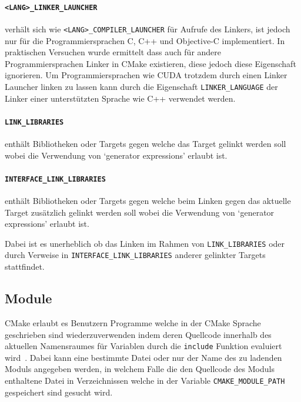 \documentclass[german,proseminar,hyperref,utf8,lof]{zihpub}
\begin{document}
    \paragraph{\texttt{<LANG>\_LINKER\_LAUNCHER}} verhält sich wie \texttt{<LANG>\_COMPILER\_LAUNCHER}
    für Aufrufe des Linkers, ist jedoch nur für die Programmiersprachen C, C++ und Objective-C implementiert.
    In praktischen Versuchen wurde ermittelt dass auch für andere Programmiersprachen Linker in CMake
    existieren, diese jedoch diese Eigenschaft ignorieren.
    Um Programmiersprachen wie CUDA trotzdem durch einen Linker Launcher linken zu lassen kann durch die
    Eigenschaft \texttt{LINKER\_LANGUAGE} der Linker einer unterstützten Sprache wie C++ verwendet werden.

    \paragraph{\texttt{LINK\_LIBRARIES}} enthält Bibliotheken oder Targets gegen welche das Target gelinkt
    werden soll wobei die Verwendung von `generator expressions' erlaubt ist.

    \paragraph{\texttt{INTERFACE\_LINK\_LIBRARIES}} enthält Bibliotheken oder Targets gegen welche beim Linken
    gegen das aktuelle Target zusätzlich gelinkt werden soll wobei die Verwendung von
    `generator expressions' erlaubt ist.

    Dabei ist es unerheblich ob das Linken im Rahmen von \texttt{LINK\_LIBRARIES} oder durch Verweise
    in \texttt{INTERFACE\_LINK\_LIBRARIES} anderer gelinkter Targets stattfindet.

    \subsection{Module}
    CMake erlaubt es Benutzern Programme welche in der CMake Sprache geschrieben sind wiederzuverwenden
    indem deren Quellcode innerhalb des aktuellen Namensraumes für Variablen durch die \texttt{include}
    Funktion evaluiert wird~.
    Dabei kann eine bestimmte Datei oder nur der Name des zu ladenden Moduls angegeben werden,
    in welchem Falle die den Quellcode des Moduls enthaltene Datei in Verzeichnissen welche in
    der Variable \texttt{CMAKE\_MODULE\_PATH} gespeichert sind gesucht wird.
\end{document}
